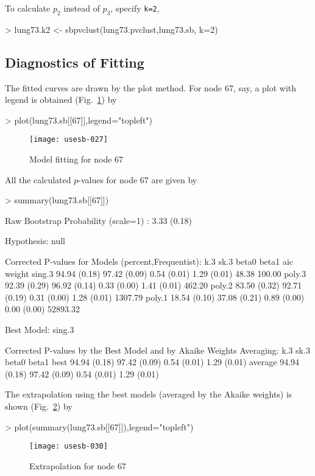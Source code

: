 \documentclass[a4paper]{amsart}
\begin{document}
To calculate $p_2$ instead of $p_3$, specify {\tt k=2},
\begin{Schunk}
\begin{Sinput}
> lung73.k2 <- sbpvclust(lung73.pvclust,lung73.sb, k=2)
\end{Sinput}
\end{Schunk}

\subsection{Diagnostics of Fitting}

The fitted curves are drawn by the plot method. For node 67, say, a
plot with legend is obtained (Fig.~\ref{fig:lungplot67}) by
\begin{Schunk}
\begin{Sinput}
> plot(lung73.sb[[67]],legend="topleft")
\end{Sinput}
\end{Schunk}
\begin{figure}
\begin{center}
\texttt{[image: usesb-027]}
\caption{Model fitting for node 67}\label{fig:lungplot67}
\end{center}
\end{figure}
All the calculated $p$-values for node 67 are given by
\begin{Schunk}
\begin{Sinput}
> summary(lung73.sb[[67]])
\end{Sinput}
\begin{Soutput}
Raw Bootstrap Probability (scale=1) : 3.33 (0.18)

Hypothesis: null 

Corrected P-values for Models (percent,Frequentist):
       k.3          sk.3         beta0       beta1       aic      weight 
sing.3 94.94 (0.18) 97.42 (0.09) 0.54 (0.01) 1.29 (0.01)    48.38 100.00 
poly.3 92.39 (0.29) 96.92 (0.14) 0.33 (0.00) 1.41 (0.01)   462.20        
poly.2 83.50 (0.32) 92.71 (0.19) 0.31 (0.00) 1.28 (0.01)  1307.79        
poly.1 18.54 (0.10) 37.08 (0.21) 0.89 (0.00) 0.00 (0.00) 52893.32        

Best Model:  sing.3 

Corrected P-values by the Best Model and by Akaike Weights Averaging:
        k.3          sk.3         beta0       beta1       
best    94.94 (0.18) 97.42 (0.09) 0.54 (0.01) 1.29 (0.01) 
average 94.94 (0.18) 97.42 (0.09) 0.54 (0.01) 1.29 (0.01) 
\end{Soutput}
\end{Schunk}
The extrapolation using the best models (averaged by the Akaike
weights) is shown (Fig.~\ref{fig:lungext67}) by
\begin{Schunk}
\begin{Sinput}
> plot(summary(lung73.sb[[67]]),legend="topleft")
\end{Sinput}
\end{Schunk}
\begin{figure}
\begin{center}
\texttt{[image: usesb-030]}
\caption{Extrapolation for node 67}\label{fig:lungext67}
\end{center}
\end{figure}
\end{document}
